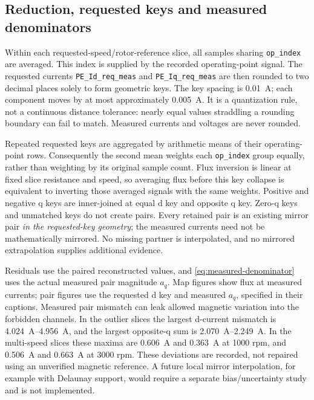 \subsection{Reduction, requested keys and measured denominators}
Within each requested-speed/rotor-reference slice, all samples sharing
\texttt{op\_index} are averaged. This index is supplied by the recorded
operating-point signal. The requested currents
\texttt{PE\_Id\_req\_meas} and \texttt{PE\_Iq\_req\_meas} are then rounded
to two decimal places solely to form geometric keys. The key spacing is
\SI{0.01}{\ampere}; each component moves by at most approximately
\SI{0.005}{\ampere}. It is a quantization rule, not a continuous distance
tolerance: nearly equal values straddling a rounding boundary can fail to
match. Measured currents and voltages are never rounded.

Repeated requested keys are aggregated by arithmetic means of their
operating-point rows. Consequently the second mean weights each
\texttt{op\_index} group equally, rather than weighting by its original sample
count. Flux inversion is linear at fixed slice resistance and speed, so
averaging flux before this key collapse is equivalent to inverting those
averaged signals with the same weights.
Positive and negative q keys are inner-joined at equal d key and opposite
q key. Zero-q keys and unmatched keys do not create pairs. Every retained
pair is an existing mirror pair \emph{in the requested-key geometry}; the
measured currents need not be mathematically mirrored. No missing partner
is interpolated, and no mirrored extrapolation supplies additional evidence.

Residuals use the paired reconstructed values, and
\cref{eq:measured-denominator} uses the actual measured pair magnitude $a_q$.
Map figures show flux at measured currents; pair figures use the requested
d key and measured $a_q$, specified in their captions.
Measured pair mismatch can leak allowed magnetic variation into the forbidden
channels. In the outlier slices the largest d-current mismatch is
\SIrange{4.024}{4.956}{\ampere}, and the largest opposite-q sum is
\SIrange{2.070}{2.249}{\ampere}. In the multi-speed slices these maxima are
\SI{0.606}{\ampere} and \SI{0.363}{\ampere} at 1000 rpm, and
\SI{0.506}{\ampere} and \SI{0.663}{\ampere} at 3000 rpm.
These deviations are recorded, not repaired using an unverified magnetic
reference. A future local mirror interpolation, for example with Delaunay
support, would require a separate bias/uncertainty study and is not implemented.

